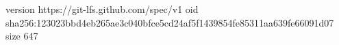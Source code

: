 version https://git-lfs.github.com/spec/v1
oid sha256:123023bbd4eb265ae3c040bfce5cd24af5f1439854fe85311aa639fe66091d07
size 647
